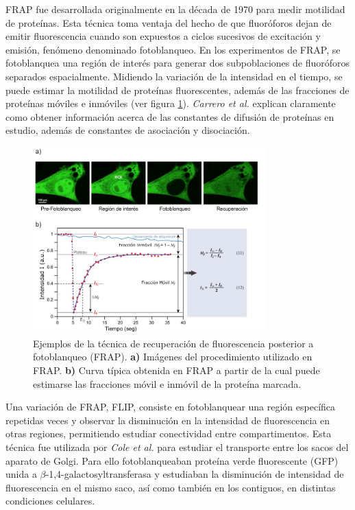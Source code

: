 FRAP fue desarrollada originalmente en la década de 1970 para medir motilidad de proteínas\cite{Ishikawa-Ankerhold2012}. Esta técnica toma ventaja del hecho de que fluoróforos dejan de emitir fluorescencia cuando son expuestos a ciclos sucesivos de excitación y emisión, fenómeno denominado fotoblanqueo. En los experimentos de FRAP, se fotoblanquea una región de interés para generar dos subpoblaciones de fluoróforos separados espacialmente. Midiendo la variación de la intensidad en el tiempo, se puede estimar la motilidad de proteínas fluorescentes\cite{Carrero2003}, además de las fracciones de proteínas móviles e inmóviles (ver figura \ref{fig:FRAP}). \textit{Carrero et al.}\cite{Carrero2003} explican claramente como obtener información acerca de las constantes de difusión de proteínas en estudio, además de constantes de asociación y disociación.

\begin{figure}
    \centering
    \includegraphics[width=0.80\textwidth]{./img/FRAP.png}
    \caption{Ejemplos de la técnica de recuperación de fluorescencia posterior a fotoblanqueo (FRAP)\cite{Ishikawa-Ankerhold2012}. \textbf{a)} Imágenes del procedimiento utilizado en FRAP. \textbf{b)} Curva típica obtenida en FRAP a partir de la cual puede estimarse las fracciones móvil e inmóvil de la proteína marcada.}
    \label{fig:FRAP}
\end{figure}

Una variación de FRAP, FLIP, consiste en fotoblanquear una región específica repetidas veces y observar la disminución en la intensidad de fluorescencia en otras regiones, permitiendo estudiar conectividad entre compartimentos. Esta técnica fue utilizada por \textit{Cole et al.}\cite{Cole1996} para estudiar el transporte entre los sacos del aparato de Golgi. Para ello fotoblanqueaban proteína verde fluorescente (GFP) unida a $\beta$-1,4-galactosyltransferasa y estudiaban la disminución de intensidad de fluorescencia en el mismo saco, así como también en los contiguos, en distintas condiciones celulares\cite{Cole1996}.


